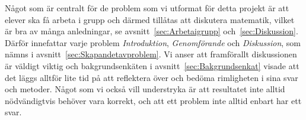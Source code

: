 
\textcolor{Mahogany}{
    Något som är centralt för de problem som vi utformat för detta projekt är att elever ska få arbeta i grupp och därmed tillåtas att diskutera matematik, vilket är bra av många anledningar, se avsnitt~\ref{sec:Arbetaigrupp} och~\ref{sec:Diskussion}. Därför innefattar varje problem \textsl{Introduktion}, \textsl{Genomförande} och \textsl{Diskussion}, som nämns i avsnitt~\ref{sec:Skapandetavproblem}. Vi anser att framförallt diskussionen är väldigt viktig och bakgrundsenkäten i avsnitt~\ref{sec:Bakgrundsenkat} visade att det läggs alltför lite tid på att reflektera över och bedöma rimligheten i sina svar och metoder. Något som vi också vill understryka är att resultatet inte alltid nödvändigtvis behöver vara korrekt, och att ett problem inte alltid enbart har ett svar.
}